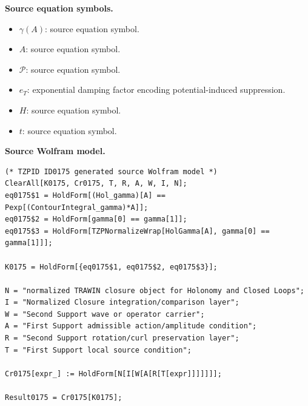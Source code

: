 \begin{minipage}[t]{0.49\linewidth}
\begingroup
\small
\raggedright
\textbf{Source equation symbols.}\par
\begin{itemize}[leftmargin=1.35em,itemsep=1pt,topsep=1pt,parsep=0pt]
    \item $\gamma(A)$: source equation symbol.
    \item $A$: source equation symbol.
    \item $\mathcal{P}$: source equation symbol.
    \item $e_T$: exponential damping factor encoding potential-induced suppression.
    \item $H$: source equation symbol.
    \item $t$: source equation symbol.
\end{itemize}
\endgroup
\end{minipage}\hfill
\begin{minipage}[t]{0.47\linewidth}
\begingroup
\scriptsize
\raggedright
\textbf{Source Wolfram model.}\par
\begin{Verbatim}[fontsize=\tiny,breaklines=true,breakanywhere=true]
(* TZPID ID0175 generated source Wolfram model *)
ClearAll[K0175, Cr0175, T, R, A, W, I, N];
eq0175$1 = HoldForm[(Hol_gamma)[A] == Pexp[(ContourIntegral_gamma)*A]];
eq0175$2 = HoldForm[gamma[0] == gamma[1]];
eq0175$3 = HoldForm[TZPNormalizeWrap[HolGamma[A], gamma[0] == gamma[1]]];

K0175 = HoldForm[{eq0175$1, eq0175$2, eq0175$3}];

N = "normalized TRAWIN closure object for Holonomy and Closed Loops";
I = "Normalized Closure integration/comparison layer";
W = "Second Support wave or operator carrier";
A = "First Support admissible action/amplitude condition";
R = "Second Support rotation/curl preservation layer";
T = "First Support local source condition";

Cr0175[expr_] := HoldForm[N[I[W[A[R[T[expr]]]]]]];

Result0175 = Cr0175[K0175];
\end{Verbatim}
\endgroup
\end{minipage}

